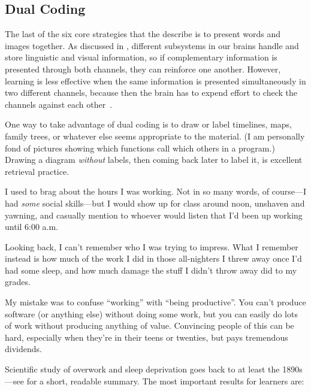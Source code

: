 \subsection*{Dual Coding}

The last of the six core strategies
that the  describe
is to present words and images together.
As discussed in ,
different subsystems in our brains handle and store linguistic and visual information,
so if complementary information is presented through both channels,
they can reinforce one another.
However,
learning is less effective when the same information is presented simultaneously in two different channels,
because then the brain has to expend effort to check the channels against each other~\cite{Maye2003}.

One way to take advantage of dual coding is to draw or label timelines,
maps, family trees,
or whatever else seems appropriate to the material.
(I am personally fond of pictures showing which functions call which others in a program.)
Drawing a diagram \emph{without} labels,
then coming back later to label it,
is excellent retrieval practice.


I used to brag about the hours I was working.
Not in so many words,
of course---I had \emph{some} social skills---but
I would show up for class around noon,
unshaven and yawning,
and casually mention to whoever would listen
that I'd been up working until 6:00 a.m.

Looking back,
I can't remember who I was trying to impress.
What I remember instead is
how much of the work I did in those all-nighters I threw away once I'd had some sleep,
and how much damage the stuff I didn't throw away did to my grades.

My mistake was to confuse ``working'' with ``being productive''.
You can't produce software (or anything else) without doing some work,
but you can easily do lots of work without producing anything of value.
Convincing people of this can be hard,
especially when they're in their teens or twenties,
but pays tremendous dividends.

Scientific study of overwork and sleep deprivation goes back to at least the 1890s---see
\cite{Robi2005} for a short, readable summary.
The most important results for learners are:

